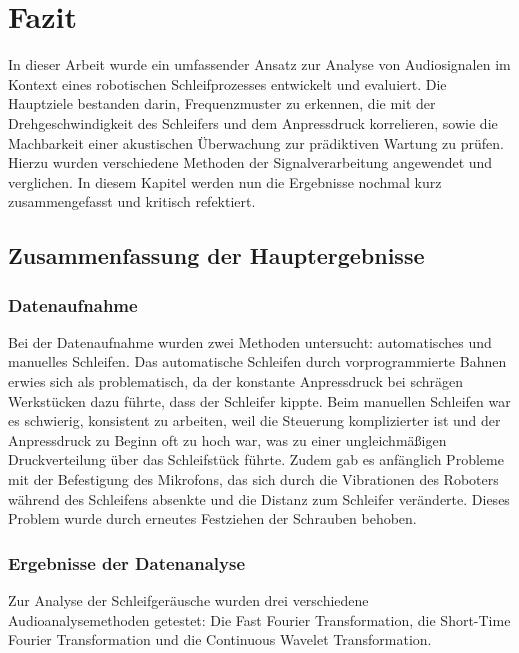 \chapter{Fazit}
\label{Kapitel8}

In dieser Arbeit wurde ein umfassender Ansatz zur Analyse von Audiosignalen im Kontext eines robotischen Schleifprozesses entwickelt und evaluiert. Die Hauptziele bestanden darin, Frequenzmuster zu erkennen, die mit der Drehgeschwindigkeit des Schleifers und dem Anpressdruck korrelieren, sowie die Machbarkeit einer akustischen Überwachung zur prädiktiven Wartung zu prüfen. Hierzu wurden verschiedene Methoden der Signalverarbeitung angewendet und verglichen. In diesem Kapitel werden nun die Ergebnisse nochmal kurz zusammengefasst und kritisch refektiert.

\section{Zusammenfassung der Hauptergebnisse}
\subsection{Datenaufnahme}

Bei der Datenaufnahme wurden zwei Methoden untersucht: automatisches und manuelles Schleifen. Das automatische Schleifen durch vorprogrammierte Bahnen erwies sich als problematisch, da der konstante Anpressdruck bei schrägen Werkstücken dazu führte, dass der Schleifer kippte. Beim manuellen Schleifen war es schwierig, konsistent zu arbeiten, weil die Steuerung komplizierter ist und der Anpressdruck zu Beginn oft zu hoch war, was zu einer ungleichmäßigen Druckverteilung über das Schleifstück führte. Zudem gab es anfänglich Probleme mit der Befestigung des Mikrofons, das sich durch die Vibrationen des Roboters während des Schleifens absenkte und die Distanz zum Schleifer veränderte. Dieses Problem wurde durch erneutes Festziehen der Schrauben behoben.

\subsection{Ergebnisse der Datenanalyse}

Zur Analyse der Schleifgeräusche wurden drei verschiedene Audioanalysemethoden getestet: Die Fast Fourier Transformation, die Short-Time Fourier Transformation und die Continuous Wavelet Transformation.

